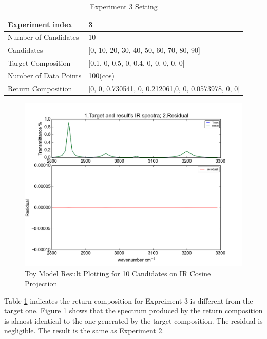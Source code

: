 \begin{table} \label{tab:3.2}
\begin{center}
\begin{tabular}{| l | p{7cm} | }
\hline
Experiment index & 3  \\
\hline
Number of Candidates & 10   \\
\hline
Candidates & [0, 10, 20, 30, 40, 50, 60, 70, 80, 90]  \\
\hline
Target Composition & [0.1, 0, 0.5, 0, 0.4, 0, 0, 0, 0, 0] \\
\hline
Number of Data Points & 100(cos) \\
\hline
Return Composition & [0, 0, 0.730541, 0, 0.212061,0, 0, 0.0573978, 0, 0] \\
\hline
\end{tabular}
\end{center}
\caption{Experiment 3 Setting}
\end{table}	

\begin{figure}[!ht] \label{fig:3.3}
\centering
\includegraphics[scale=0.7]{Figures/toy_model_result_plotting_ir_cos_10candi_1.png} 
\caption{Toy Model Result Plotting for 10 Candidates on IR Cosine Projection}
\end{figure}

Table \ref{tab:3.2} indicates the return composition for Expreiment 3 is different from the target one. Figure \ref{fig:3.3} shows that the spectrum produced by the return composition is almost identical to the one generated by the target composition. The residual is negligible. The result is the same as Experiment 2. \\


